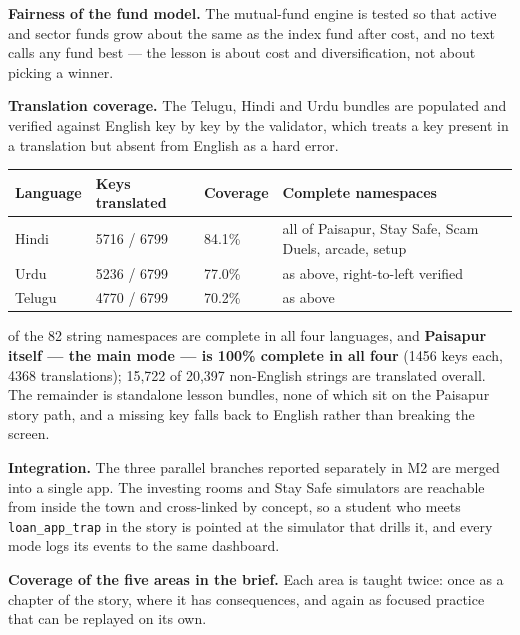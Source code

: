 \documentclass[10pt,a4paper]{article}
\begin{document}
\textbf{Fairness of the fund model.} The mutual-fund engine is tested so that active and sector funds grow about the same as the index fund after cost, and no text calls any fund best --- the lesson is about cost and diversification, not about picking a winner.

\textbf{Translation coverage.} The Telugu, Hindi and Urdu bundles are populated and verified against English key by key by the validator, which treats a key present in a translation but absent from English as a hard error.

\begin{center}\small
\begin{tabular}{@{}p{2.8cm}p{3.0cm}p{2.4cm}p{7.6cm}@{}}
\toprule
\textbf{Language} & \textbf{Keys translated} & \textbf{Coverage} & \textbf{Complete namespaces}\\
\midrule
Hindi   & 5716 / 6799 & 84.1\% & all of Paisapur, Stay Safe, Scam Duels, arcade, setup\\
Urdu    & 5236 / 6799 & 77.0\% & as above, right-to-left verified\\
Telugu  & 4770 / 6799 & 70.2\% & as above\\
\bottomrule
\end{tabular}
\end{center}

 of the 82 string namespaces are complete in all four languages, and \textbf{Paisapur itself --- the main mode --- is 100\% complete in all four} (1456 keys each, 4368 translations); 15{,}722 of 20{,}397 non-English strings are translated overall. The remainder is standalone lesson bundles, none of which sit on the Paisapur story path, and a missing key falls back to English rather than breaking the screen.

\textbf{Integration.} The three parallel branches reported separately in M2 are merged into a single app. The investing rooms and Stay Safe simulators are reachable from inside the town and cross-linked by concept, so a student who meets \texttt{loan\_app\_trap} in the story is pointed at the simulator that drills it, and every mode logs its events to the same dashboard.

\textbf{Coverage of the five areas in the brief.} Each area is taught twice: once as a chapter of the story, where it has consequences, and again as focused practice that can be replayed on its own.
\end{document}
